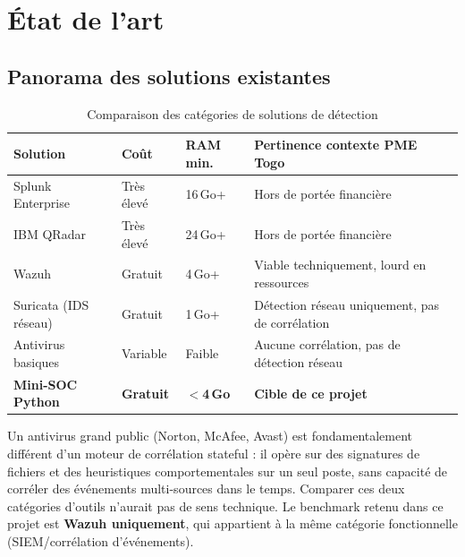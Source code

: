 \documentclass[11pt,a4paper]{article}
\begin{document}
\section{État de l'art}

\subsection{Panorama des solutions existantes}

\begin{table}[H]
\centering
\caption{Comparaison des catégories de solutions de détection}
\small
\begin{tabularx}{\textwidth}{L{2.8cm} C{2cm} C{2cm} L{5cm}}
\toprule
{}
{\color{white}\textbf{Solution}} &
{\color{white}\textbf{Coût}} &
{\color{white}\textbf{RAM min.}} &
{\color{white}\textbf{Pertinence contexte PME Togo}} \\
\midrule
Splunk Enterprise & Très élevé & 16\,Go+ & Hors de portée financière \\
\midrule
IBM QRadar & Très élevé & 24\,Go+ & Hors de portée financière \\
\midrule
{}
Wazuh & Gratuit & 4\,Go+ & Viable techniquement, lourd en ressources \\
\midrule
Suricata (IDS réseau) & Gratuit & 1\,Go+ & Détection réseau uniquement, pas de corrélation \\
\midrule
{}
Antivirus basiques & Variable & Faible & Aucune corrélation, pas de détection réseau \\
\midrule
\textbf{Mini-SOC Python} & \textbf{Gratuit} & \textbf{$<$4\,Go} & \textbf{Cible de ce projet} \\
\bottomrule
\end{tabularx}
\end{table}

\begin{warningbox}[title={Pourquoi Norton est exclu du benchmark}]
Un antivirus grand public (Norton, McAfee, Avast) est fondamentalement différent
d'un moteur de corrélation stateful : il opère sur des signatures de fichiers et
des heuristiques comportementales sur un seul poste, sans capacité de corréler
des événements multi-sources dans le temps.
Comparer ces deux catégories d'outils n'aurait pas de sens technique.
Le benchmark retenu dans ce projet est \textbf{Wazuh uniquement},
qui appartient à la même catégorie fonctionnelle (SIEM/corrélation d'événements).
\end{warningbox}
\end{document}
